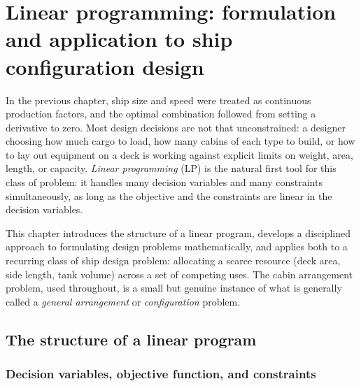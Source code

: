 \chapter{Linear programming: formulation and application to ship configuration design}
\label{ch:lp-intro}

In the previous chapter, ship size and speed were treated as continuous
production factors, and the optimal combination followed from setting a
derivative to zero. Most design decisions are not that unconstrained: a
designer choosing how much cargo to load, how many cabins of each type to
build, or how to lay out equipment on a deck is working against explicit
limits on weight, area, length, or capacity. \emph{Linear programming} (LP)
is the natural first tool for this class of problem: it handles many
decision variables and many constraints simultaneously, as long as the
objective and the constraints are linear in the decision variables.

This chapter introduces the structure of a linear program, develops a
disciplined approach to formulating design problems mathematically, and
applies both to a recurring class of ship design problem: allocating a
scarce resource (deck area, side length, tank volume) across a set of
competing uses. The cabin arrangement problem, used throughout, is a small
but genuine instance of what is generally called a \emph{general
arrangement} or \emph{configuration} problem.

\section{The structure of a linear program}

\subsection{Decision variables, objective function, and constraints}

